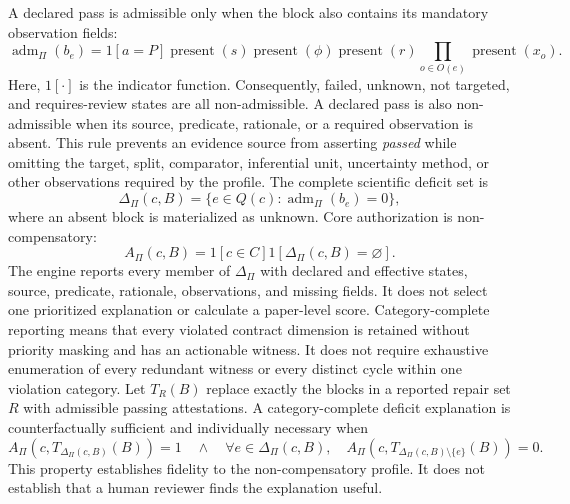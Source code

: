 A declared pass is admissible only when the block also contains its mandatory observation fields:
\begin{equation}
\operatorname{adm}_{\Pi}(b_e)=
\mathrm{1}[a=P]\operatorname{present}(s)\operatorname{present}(\phi)
\operatorname{present}(r)\prod_{o\in O(e)}\operatorname{present}(x_o).
\label{eq:admissibility}
\end{equation}
Here, $\mathrm{1}[\cdot]$ is the indicator function. Consequently, failed, unknown, not targeted, and requires-review states are all non-admissible. A declared pass is also non-admissible when its source, predicate, rationale, or a required observation is absent. This rule prevents an evidence source from asserting \emph{passed} while omitting the target, split, comparator, inferential unit, uncertainty method, or other observations required by the profile. The complete scientific deficit set is
\begin{equation}
\Delta_{\Pi}(c,B)=\{e\in Q(c):\operatorname{adm}_{\Pi}(b_e)=0\},
\label{eq:scientific-deficits}
\end{equation}
where an absent block is materialized as unknown. Core authorization is non-compensatory:
\begin{equation}
A_{\Pi}(c,B)=\mathrm{1}[c\in C]\mathrm{1}[\Delta_{\Pi}(c,B)=\varnothing].
\label{eq:core-authorization}
\end{equation}
The engine reports every member of $\Delta_{\Pi}$ with declared and effective states, source, predicate, rationale, observations, and missing fields. It does not select one prioritized explanation or calculate a paper-level score. Category-complete reporting means that every violated contract dimension is retained without priority masking and has an actionable witness. It does not require exhaustive enumeration of every redundant witness or every distinct cycle within one violation category. Let $T_R(B)$ replace exactly the blocks in a reported repair set $R$ with admissible passing attestations. A category-complete deficit explanation is counterfactually sufficient and individually necessary when
\begin{equation}
A_{\Pi}(c,T_{\Delta_{\Pi}(c,B)}(B))=1
\quad\land\quad
\forall e\in\Delta_{\Pi}(c,B),\quad
A_{\Pi}(c,T_{\Delta_{\Pi}(c,B)\setminus\{e\}}(B))=0.
\label{eq:counterfactual-explanation}
\end{equation}
This property establishes fidelity to the non-compensatory profile. It does not establish that a human reviewer finds the explanation useful.

